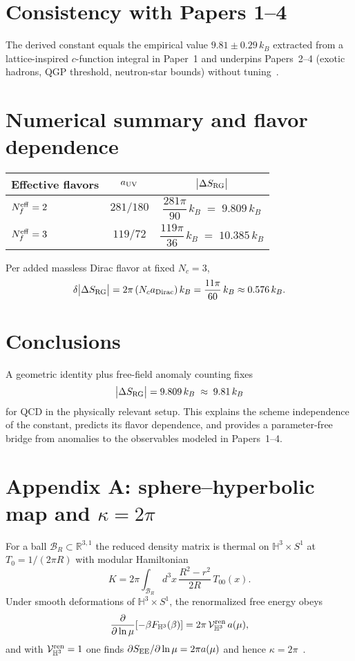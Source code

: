 \documentclass[11pt]{article}
\begin{document}
\section{Consistency with Papers 1--4}
The derived constant equals the empirical value $9.81\pm0.29\,k_B$ extracted from a lattice-inspired $c$-function integral in Paper~1 and underpins Papers~2--4 (exotic hadrons, QGP threshold, neutron-star bounds) without tuning~\cite{TupayP1,TupayP2,TupayP3,TupayP4}.

\section{Numerical summary and flavor dependence}
\begin{center}
\begin{tabular}{@{}lcc@{}}
\toprule
Effective flavors & $a_{\rm UV}$ & $\big|\Delta S_{\rm RG}\big|$ \\
\midrule
$N_f^{\rm eff}=2$ & $281/180$ & $\dfrac{281\pi}{90}\,k_B\;=\;9.809\,k_B$ \\
$N_f^{\rm eff}=3$ & $119/72$  & $\dfrac{119\pi}{36}\,k_B\;=\;10.385\,k_B$ \\
\bottomrule
\end{tabular}
\end{center}
Per added massless Dirac flavor at fixed $N_c{=}3$,
\[
\delta\big|\Delta S_{\rm RG}\big|
= 2\pi\,(N_c a_{\text{Dirac}})\,k_B
= \frac{11\pi}{60}\,k_B \approx 0.576\,k_B.
\]

\section*{Conclusions}
A geometric identity plus free-field anomaly counting fixes
\[
\big|\Delta S_{\rm RG}\big|=9.809\,k_B\;\approx\;9.81\,k_B
\]
for QCD in the physically relevant setup. This explains the scheme independence of the constant, predicts its flavor dependence, and provides a parameter-free bridge from anomalies to the observables modeled in Papers~1--4.

\appendix

\section*{Appendix A: sphere--hyperbolic map and $\kappa=2\pi$}
For a ball $\mathcal{B}_R\subset\mathbb{R}^{3,1}$ the reduced density matrix is thermal on $\mathbb{H}^3\times S^1$ at $T_0=1/(2\pi R)$ with modular Hamiltonian
\[
K=2\pi \int_{\mathcal{B}_R}\! d^3x\,\frac{R^2-r^2}{2R}\,T_{00}(x).
\]
Under smooth deformations of $\mathbb{H}^3\times S^1$, the renormalized free energy obeys
\[
\frac{\partial}{\partial\ln\mu}\!\left[-\beta F_{\mathbb{H}^3}(\beta)\right]=2\pi\,\mathcal{V}^{\rm ren}_{\mathbb{H}^3}\,a(\mu),
\]
and with $\mathcal{V}^{\rm ren}_{\mathbb{H}^3}=1$ one finds $\partial S_{\rm EE}/\partial\ln\mu=2\pi a(\mu)$ and hence $\kappa=2\pi$~\cite{CHM,Solodukhin}.
\end{document}
